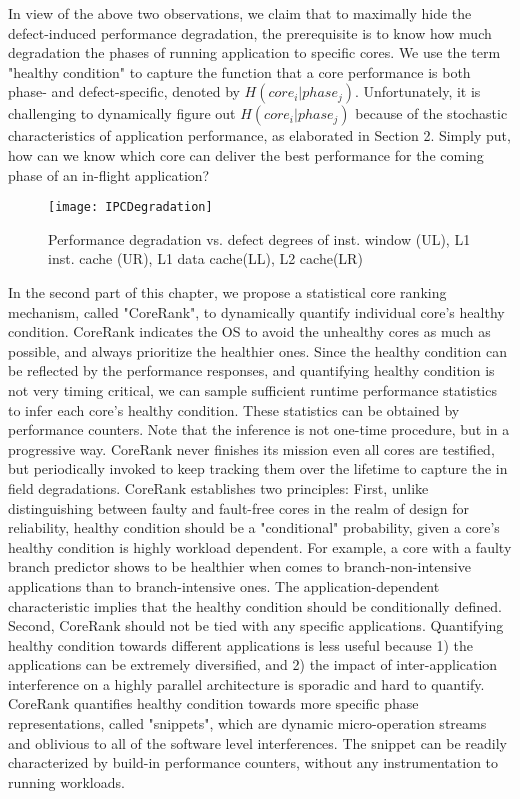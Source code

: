 In view of the above two observations, we claim that to maximally hide the defect-induced performance degradation, the prerequisite is to know how much degradation the phases of running application to specific cores. We use the term "healthy condition" to capture the function that a core performance is both phase- and defect-specific, denoted by $H(core_i|phase_j)$. Unfortunately, it is challenging to dynamically figure out $H(core_i|phase_j)$ because of the stochastic characteristics of application performance, as elaborated in Section 2. Simply put, how can we know which core can deliver the best performance for the coming phase of an in-flight application?

\begin{figure}[t]
    \centering
    \texttt{[image: IPCDegradation]}\\
    \caption{Performance degradation  vs. defect degrees of inst. window  (UL), L1 inst. cache (UR), L1 data cache(LL), L2 cache(LR)}
    \label{degrade}
\end{figure}

In the second part of this chapter, we propose a statistical core ranking mechanism, called "CoreRank", to dynamically quantify individual core's healthy condition. CoreRank indicates the OS to avoid the unhealthy cores as much as possible, and always prioritize the healthier ones. Since the healthy condition can be reflected by the performance responses, and quantifying healthy condition is not very timing critical,  we can sample sufficient runtime performance statistics to infer each core's healthy condition. These statistics can be obtained by performance counters. Note that the inference is not one-time procedure, but in a progressive way. CoreRank never finishes its mission even all cores are testified, but periodically invoked to keep tracking them over the lifetime to capture the in field degradations. CoreRank establishes two principles: First, unlike distinguishing between faulty and fault-free cores in the realm of design for reliability, healthy condition should be a "conditional" probability, given a core's healthy condition is highly workload dependent. For example, a core with a faulty branch predictor shows to be healthier when comes to  branch-non-intensive applications than to branch-intensive ones. The application-dependent characteristic implies that the healthy condition should be conditionally defined. Second, CoreRank should not be tied with any specific applications. Quantifying healthy condition towards different applications is less useful because 1) the applications can be extremely diversified, and 2) the impact of inter-application interference on a highly parallel architecture is sporadic and hard to quantify.  CoreRank quantifies healthy condition towards  more specific phase representations, called "snippets", which are dynamic micro-operation streams and oblivious to all of the software level interferences. The snippet can be readily characterized by build-in performance counters, without any instrumentation to running workloads.

